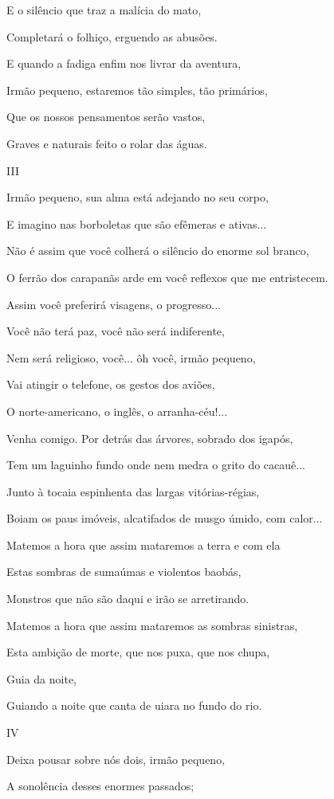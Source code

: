 E o silêncio que traz a malícia do mato,

Completará o folhiço, erguendo as abusões.

E quando a fadiga enfim nos livrar da aventura,

Irmão pequeno, estaremos tão simples, tão primários,

Que os nossos pensamentos serão vastos,

Graves e naturais feito o rolar das águas.

III

Irmão pequeno, sua alma está adejando no seu corpo,

E imagino nas borboletas que são efêmeras e ativas...

Não é assim que você colherá o silêncio do enorme sol branco,

O ferrão dos carapanãs arde em você reflexos que me entristecem.

Assim você preferirá visagens, o progresso...

Você não terá paz, você não será indiferente,

Nem será religioso, você... ôh você, irmão pequeno,

Vai atingir o telefone, os gestos dos aviões,

O norte-americano, o inglês, o arranha-céu!...

Venha comigo. Por detrás das árvores, sobrado dos igapós,

Tem um laguinho fundo onde nem medra o grito do cacauê...

Junto à tocaia espinhenta das largas vitórias-régias,

Boiam os paus imóveis, alcatifados de musgo úmido, com calor...

Matemos a hora que assim mataremos a terra e com ela

Estas sombras de sumaúmas e violentos baobás,

Monstros que não são daqui e irão se arretirando.

Matemos a hora que assim mataremos as sombras sinistras,

Esta ambição de morte, que nos puxa, que nos chupa,

Guia da noite,

Guiando a noite que canta de uiara no fundo do rio.

IV

Deixa pousar sobre nós dois, irmão pequeno,

A sonolência desses enormes passados;

